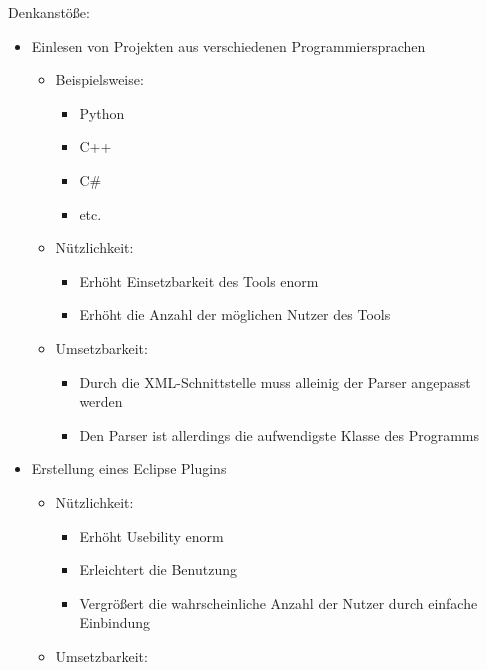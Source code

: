 Denkanstöße:
\begin{itemize}
	\item Einlesen von Projekten aus verschiedenen Programmiersprachen
	\begin{itemize}
		\item Beispielsweise:
		\begin{itemize}
			\item Python
			\item C++
			\item C\#
			\item etc.
		\end{itemize}
			\item Nützlichkeit:
		\begin{itemize}
			\item Erhöht Einsetzbarkeit des Tools enorm
			\item Erhöht die Anzahl der möglichen Nutzer des Tools
		\end{itemize}
			\item Umsetzbarkeit:
		\begin{itemize}
			\item Durch die XML-Schnittstelle muss alleinig der Parser angepasst werden
			\item Den Parser ist allerdings die aufwendigste Klasse des Programms
		\end{itemize}
	\end{itemize}
	\item Erstellung eines Eclipse Plugins
	\begin{itemize}
		\item Nützlichkeit:
		\begin{itemize}
			\item Erhöht Usebility enorm
			\item Erleichtert die Benutzung
			\item Vergrößert die wahrscheinliche Anzahl der Nutzer durch einfache Einbindung
		\end{itemize}
			\item Umsetzbarkeit:

\end{itemize}
\end{itemize}
